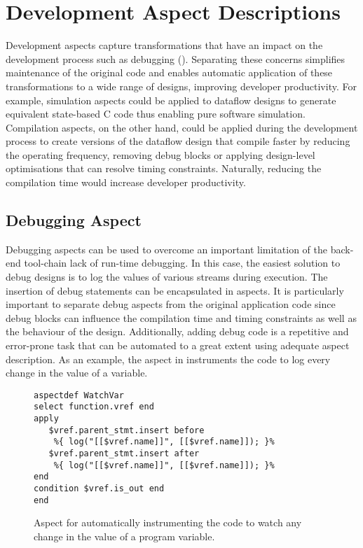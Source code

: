 \section{Development Aspect Descriptions}



Development aspects capture transformations that have an impact on the
development process such as debugging
(). Separating these concerns simplifies
maintenance of the original code and enables automatic application of
these transformations to a wide range of designs, improving developer
productivity. For example, simulation aspects could be applied to
dataflow designs to generate equivalent state-based C code thus
enabling pure software simulation. Compilation aspects, on the other
hand, could be applied during the development process to create
versions of the dataflow design that compile faster by reducing the
operating frequency, removing debug blocks or applying design-level
optimisations that can resolve timing constraints. Naturally, reducing
the compilation time would increase developer productivity.

\subsection{Debugging Aspect}
\label{sect:asp_debug}

Debugging aspects can be used to overcome an important limitation of
the back-end tool-chain lack of run-time debugging. In this case, the
easiest solution to debug designs is to log the values of various
streams during execution. The insertion of debug statements can be
encapsulated in aspects. It is particularly important to separate
debug aspects from the original application code since debug blocks
can influence the compilation time and timing constraints as well as
the behaviour of the design. Additionally, adding debug code is a
repetitive and error-prone task that can be automated to a great
extent using adequate aspect description. As an example, the aspect in
 instruments the code to log every change in
the value of a variable.

\lstset{style=lara}
\begin{figure}[!h]
  \centering
\begin{lstlisting}
aspectdef WatchVar
select function.vref end
apply
   $vref.parent_stmt.insert before
    %{ log("[[$vref.name]]", [[$vref.name]]); }%
   $vref.parent_stmt.insert after
    %{ log("[[$vref.name]]", [[$vref.name]]); }%
end
condition $vref.is_out end
end
\end{lstlisting}
  \caption{Aspect for automatically instrumenting the code to watch any change in the value of a program variable.}
  \label{fig:aspect-debug}
\end{figure}


